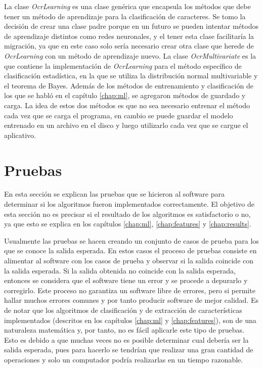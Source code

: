 \documentclass[a4paper, 11pt, oneside]{report}
\begin{document}
La clase {\it OcrLearning} es una clase genérica que encapsula los métodos que debe tener un método de aprendizaje para la clasificación de caracteres. Se tomo la decisión de crear una clase padre porque en un futuro se pueden intentar métodos de aprendizaje distintos como redes neuronales, y el tener esta clase facilitaría la migración, ya que en este caso solo sería necesario crear otra clase que herede de {\it OcrLearning} con un método de aprendizaje nuevo. La clase {\it OcrMultivariate} es la que contiene la implementación de {\it OcrLearning} para el método específico de clasificación estadística, en la que se utiliza la distribución normal multivariable y el teorema de Bayes. Además de los métodos de entrenamiento y clasificación de los que se habló en el capítulo \ref{chap:ml}, se agregaron métodos de guardado y carga. La idea de estos dos métodos es que no sea necesario entrenar el método cada vez que se carga el programa, en cambio se puede guardar el modelo entrenado en un archivo en el disco y luego utilizarlo cada vez que se cargue el aplicativo.

\section{Pruebas}

En esta sección se explican las pruebas que se hicieron al software para determinar si los algoritmos fueron implementados correctamente. El objetivo de esta sección no es precisar si el resultado de los algoritmos es satisfactorio o no, ya que esto se explica en los capítulos \ref{chap:ml}, \ref{chap:features} y \ref{chap:results}.

Usualmente las pruebas se hacen creando un conjunto de casos de prueba para los que se conoce la salida esperada. En estos casos el proceso de pruebas consiste en alimentar al software con los casos de prueba y observar si la salida coincide con la salida esperada. Si la salida obtenida no coincide con la salida esperada, entonces se considera que el software tiene un error y se procede a depurarlo y corregirlo. Este proceso no garantiza un software libre de errores, pero si permite hallar muchos errores comunes y por tanto producir software de mejor calidad. Es de notar que los algoritmos de clasificación y de extracción de características implementados (descritos en los capítulos \ref{chap:ml} y \ref{chap:features}), son de una naturaleza matemática y, por tanto, no es fácil aplicarle este tipo de pruebas. Esto es debido a que muchas veces no es posible determinar cual debería ser la salida esperada, pues para hacerlo se tendrían que realizar una gran cantidad de operaciones y solo un computador podría realizarlas en un tiempo razonable. 
\end{document}
